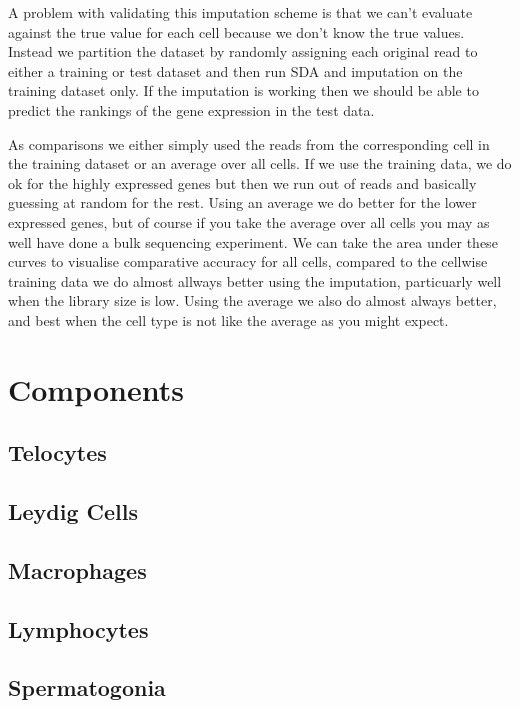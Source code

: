 A problem with validating this imputation scheme is that we can't evaluate against the true value for each cell because we don't know the true values. Instead we partition the dataset by randomly assigning each original read to either a training or test dataset and then run SDA and imputation on the training dataset only. If the imputation is working then we should be able to predict the rankings of the gene expression in the test data.



As comparisons we either simply used the reads from the corresponding cell in the training dataset or an average over all cells. If we use the training data, we do ok for the highly expressed genes but then we run out of reads and basically guessing at random for the rest. Using an average we do better for the lower expressed genes, but of course if you take the average over all cells you may as well have done a bulk sequencing experiment. We can take the area under these curves to visualise comparative accuracy for all cells, compared to the cellwise training data we do almost allways better using the imputation, particuarly well when the library size is low. Using the average we also do almost always better, and best when the cell type is not like the average as you might expect.


\section{Components}

\subsection{Telocytes}

\subsection{Leydig Cells}

\subsection{Macrophages}

\subsection{Lymphocytes}

\subsection{Spermatogonia}


